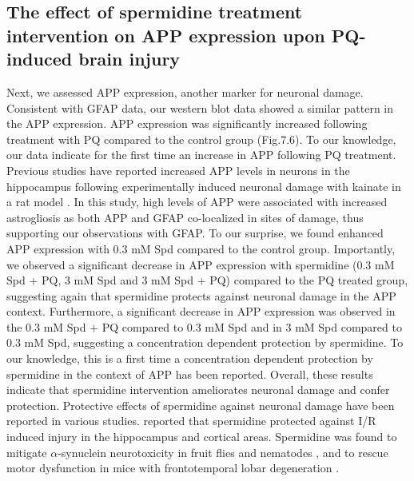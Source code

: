 \subsection{The effect of spermidine treatment intervention on APP expression upon PQ-induced brain injury}
Next, we assessed APP expression, another marker for neuronal damage. Consistent with GFAP data, our western blot data showed a similar pattern in the APP expression. APP expression was significantly increased following treatment with PQ compared to the control group (Fig.7.6). To our knowledge, our data indicate for the first time an increase in APP following PQ treatment. Previous studies have reported increased APP levels in neurons in the hippocampus following experimentally induced neuronal damage with kainate in a rat model \citep{Siman1989}. In this study, high levels of APP were associated with increased astrogliosis as both APP and GFAP co-localized in sites of damage, thus supporting our observations with GFAP. To our surprise, we found enhanced APP expression with 0.3 mM Spd compared to the control group. Importantly, we observed a significant decrease in APP expression with spermidine (0.3 mM Spd + PQ, 3 mM Spd and 3 mM Spd + PQ) compared to the PQ treated group, suggesting again that spermidine protects against neuronal damage in the APP context. Furthermore, a significant decrease in APP expression was observed in the 0.3 mM Spd + PQ compared to 0.3 mM Spd and in 3 mM Spd compared to 0.3 mM Spd, suggesting a concentration dependent protection by spermidine. To our knowledge, this is a first time a concentration dependent protection by spermidine in the context of APP has been reported. Overall, these results indicate that spermidine intervention ameliorates neuronal damage and confer protection. Protective effects of spermidine against neuronal damage have been reported in various studies. \citet{Yang2017} reported that spermidine protected against I/R induced injury in the hippocampus and cortical areas. Spermidine was found to mitigate $\alpha$-synuclein neurotoxicity in fruit flies and nematodes \citep{Buttner2014}, and to rescue motor dysfunction in mice with frontotemporal lobar degeneration \citep{Wang2012}.

